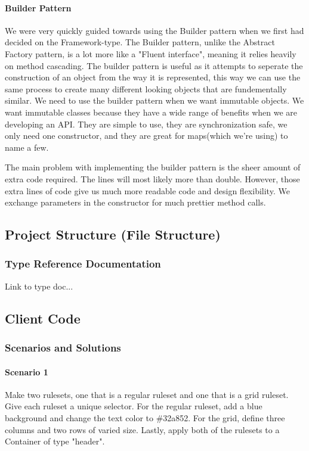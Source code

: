 \documentclass[12pt]{article}
\begin{document}
        \paragraph{Builder Pattern}
        We were very quickly guided towards using the Builder pattern when we first had decided on the Framework-type. The Builder pattern, unlike the Abstract Factory pattern, is a lot more like a "Fluent interface", meaning it relies heavily on method cascading.
        The builder pattern is useful as it attempts to seperate the construction of an object from the way it is represented, this way we can use the same process to create many different looking objects that are fundementally similar.
        We need to use the builder pattern when we want immutable objects. We want immutable classes because they have a wide range of benefits when we are developing an API. They are simple to use, they are synchronization safe, we only need one constructor, and they are great for maps(which we're using) to name a few.

        The main problem with implementing the builder pattern is the sheer amount of extra code required. The lines will most likely more than double. However, those extra lines of code give us much more readable code and design flexibility. We exchange parameters in the constructor for much prettier method calls.

    \subsection{Project Structure (File Structure)}

        \subsubsection{Type Reference Documentation}
        Link to type doc...

    \subsection{Client Code}

        \subsubsection{Scenarios and Solutions}

        \paragraph{Scenario 1}
        Make two rulesets, one that is a regular ruleset and one that is a grid ruleset. Give each ruleset a unique selector. For the regular ruleset, add a blue background and change the text color to \#32a852. For the grid, define three columns and two rows of varied size. Lastly, apply both of the rulesets to a Container of type "header".
\end{document}
